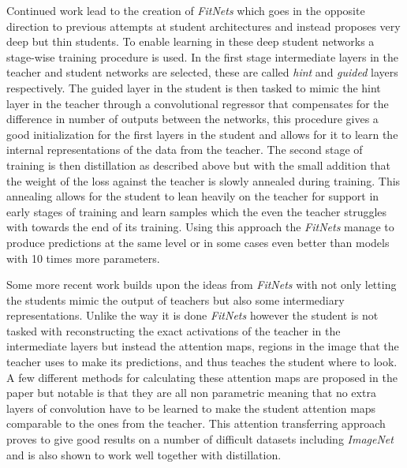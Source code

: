 \documentclass{kththesis}
\newcommand{\bibentry}[1]{\parencite{#1}}
\begin{document}
Continued work lead to the creation of \emph{FitNets}
\bibentry{romero2014fitnets} which goes in the opposite direction to previous
attempts at student architectures and instead proposes very deep but thin
students. To enable learning in these deep student networks a stage-wise
training procedure is used. In the first stage intermediate layers in the
teacher and student networks are selected, these are called \emph{hint} and
\emph{guided} layers respectively. The guided layer in the student is then
tasked to mimic the hint layer in the teacher through a convolutional regressor
that compensates for the difference in number of outputs between the networks,
this procedure gives a good initialization for the first layers in the student
and allows for it to learn the internal representations of the data from the
teacher. The second stage of training is then distillation as described above
but with the small addition that the weight of the loss against the teacher is
slowly annealed during training. This annealing allows for the student to lean
heavily on the teacher for support in early stages of training and learn samples
which the even the teacher struggles with towards the end of its training. Using
this approach the \emph{FitNets} manage to produce predictions at the same level
or in some cases even better than models with 10 times more parameters. 

Some more recent work \bibentry{zagouruyko2017paying} builds upon the ideas from
\emph{FitNets} with not only letting the students mimic the output of teachers
but also some intermediary representations. Unlike the way it is done
\emph{FitNets} however the student is not tasked with reconstructing the exact
activations of the teacher in the intermediate layers but instead the attention
maps, regions in the image that the teacher uses to make its predictions, and
thus teaches the student where to look. A few different methods for calculating
these attention maps are proposed in the paper but notable is that they are all
non parametric meaning that no extra layers of convolution have to be learned to
make the student attention maps comparable to the ones from the teacher. This
attention transferring approach proves to give good results on a number of
difficult datasets including \emph{ImageNet} and is also shown to work well
together with distillation. 
\end{document}
